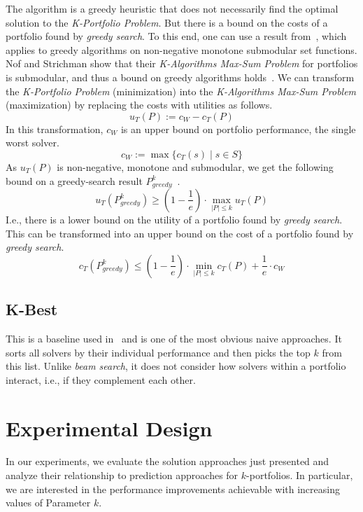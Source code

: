 \documentclass[conference]{IEEEtran}
\begin{document}
The algorithm is a greedy heuristic that does not necessarily find the optimal solution to the \emph{K-Portfolio Problem}. 
But there is a bound on the costs of a portfolio found by \emph{greedy search}. 
To this end, one can use a result from~\cite{nemhauser1978analysis}, which applies to greedy algorithms on non-negative monotone submodular set functions.
Nof and Strichman show that their \emph{K-Algorithms Max-Sum Problem} for portfolios is submodular, and thus a bound on greedy algorithms holds~\cite{nof2020real}. 
We can transform the \emph{K-Portfolio Problem} (minimization) into the \emph{K-Algorithms Max-Sum Problem} (maximization) by replacing the costs with utilities as follows.%
$$
u_{T}(P) := c_W - c_{T}(P)
$$
In this transformation, $c_W$ is an upper bound on portfolio performance, the single worst solver.%
$$
c_W := \max\{c_T(s) \mid s \in S\}
$$
As $u_{T}(P)$ is non-negative, monotone and submodular, we get the following bound on a greedy-search result $P_{greedy}^k$~\cite{nemhauser1978analysis, krause2014submodular}.%
$$
	u_{T}(P_{greedy}^k) \geq (1 - \frac{1}{e}) \cdot \max_{|P| \leq k}{u_{T}(P)}
$$
I.e., there is a lower bound on the utility of a portfolio found by \emph{greedy search}.
This can be transformed into an upper bound on the cost of a portfolio found by \emph{greedy search}.%
\begin{equation}
	c_{T}(P_{greedy}^k) \leq (1 - \frac{1}{e}) \cdot \min_{|P| \leq k}{c_{T}(P)} + \frac{1}{e} \cdot c_W
	\label{eq:upper-bound}
\end{equation}


\subsection{K-Best}
\label{sec:approach:k-best}

This is a baseline used in~\cite{nof2020real} and is one of the most obvious naive approaches. 
It sorts all solvers by their individual performance and then picks the top $k$ from this list.
Unlike \emph{beam search}, it does not consider how solvers within a portfolio interact, i.e., if they complement each other.


\section{Experimental Design}
\label{sec:experimental-design}

In our experiments, we evaluate the solution approaches just presented and analyze their relationship to prediction approaches for $k$-portfolios. 
In particular, we are interested in the performance improvements achievable with increasing values of Parameter $k$. 
\end{document}
